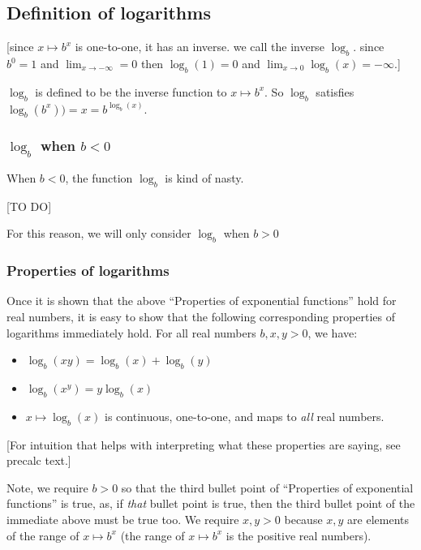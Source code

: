 \subsection*{Definition of logarithms}

[since $x \mapsto b^x$ is one-to-one, it has an inverse. we call the inverse $\log_b$. since $b^0 = 1$ and $\lim_{x \rightarrow -\infty} = 0$ then $\log_b(1) = 0$ and $\lim_{x \rightarrow 0} \log_b(x) = - \infty$.]

$\log_b$ is defined to be the inverse function to $x \mapsto b^x$. So $\log_b$ satisfies $\log_b(b^x)) = x = b^{\log_b(x)}$.

\subsubsection*{$\log_b$ when $b < 0$}

When $b < 0$, the function $\log_b$ is kind of nasty.

[TO DO]

For this reason, we will only consider $\log_b$ when $b > 0$

\subsubsection*{Properties of logarithms}

Once it is shown that the above ``Properties of exponential functions'' hold for real numbers, it is easy to show that the following corresponding properties of logarithms immediately hold. For all real numbers $b, x, y > 0$, we have:

\begin{itemize}
    \item $\log_b(xy) = \log_b(x) + \log_b(y)$
    \item $\log_b(x^y) = y\log_b(x)$
    \item $x \mapsto \log_b(x)$ is continuous, one-to-one, and maps to \textit{all} real numbers.
\end{itemize}

[For intuition that helps with interpreting what these properties are saying, see precalc text.]

Note, we require $b > 0$ so that the third bullet point of ``Properties of exponential functions'' is true, as, if \textit{that} bullet point is true, then the third bullet point of the immediate above must be true too. We require $x, y > 0$ because $x, y$ are elements of the range of $x \mapsto b^x$ (the range of $x \mapsto b^x$ is the positive real numbers).

